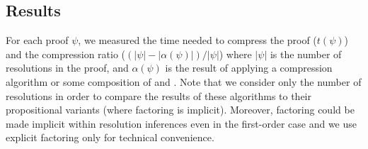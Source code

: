 







\subsection{Results}
For each proof $\psi$, we measured the time needed to compress the proof ($t(\psi)$) and the compression ratio ($(|\psi|-|\alpha(\psi)|)/|\psi|$) where $|\psi|$ is the number of resolutions in the proof, and $\alpha(\psi)$ is the result of applying a compression algorithm or some composition of {\FORPI} and {\GFOLU}. Note that we consider only the number of resolutions in order to compare the results of these algorithms to their propositional variants (where factoring is implicit). Moreover, factoring could be made implicit within resolution inferences even in the first-order case and we use explicit factoring only for technical convenience.

